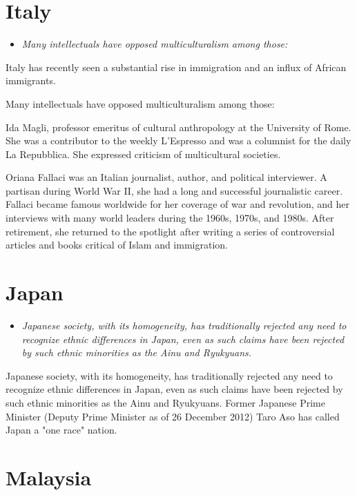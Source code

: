 \section{Italy}\label{italy}

\begin{itemize}
\item
  \emph{Many intellectuals have opposed multiculturalism among those:}
\end{itemize}

Italy has recently seen a substantial rise in immigration and an influx
of African immigrants.

Many intellectuals have opposed multiculturalism among those:

Ida Magli, professor emeritus of cultural anthropology at the University
of Rome. She was a contributor to the weekly L'Espresso and was a
columnist for the daily La Repubblica. She expressed criticism of
multicultural societies.

Oriana Fallaci was an Italian journalist, author, and political
interviewer. A partisan during World War II, she had a long and
successful journalistic career. Fallaci became famous worldwide for her
coverage of war and revolution, and her interviews with many world
leaders during the 1960s, 1970s, and 1980s. After retirement, she
returned to the spotlight after writing a series of controversial
articles and books critical of Islam and immigration.

\section{Japan}\label{japan}

\begin{itemize}
\item
  \emph{Japanese society, with its homogeneity, has traditionally
  rejected any need to recognize ethnic differences in Japan, even as
  such claims have been rejected by such ethnic minorities as the Ainu
  and Ryukyuans.}
\end{itemize}

Japanese society, with its homogeneity, has traditionally rejected any
need to recognize ethnic differences in Japan, even as such claims have
been rejected by such ethnic minorities as the Ainu and Ryukyuans.
Former Japanese Prime Minister (Deputy Prime Minister as of 26 December
2012) Taro Aso has called Japan a "one race" nation.

\section{Malaysia}\label{malaysia}

